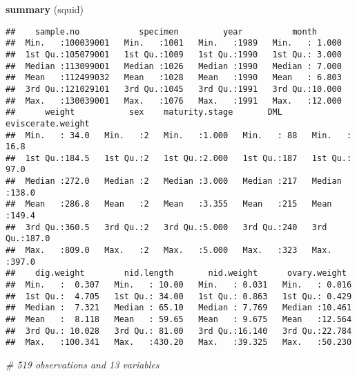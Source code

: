 \documentclass[
]{article}
\newenvironment{Shaded}{\begin{snugshade}}{\end{snugshade}}
\newcommand{\CommentTok}[1]{\textcolor[rgb]{0.56,0.35,0.01}{\textit{#1}}}
\newcommand{\FunctionTok}[1]{\textcolor[rgb]{0.13,0.29,0.53}{\textbf{#1}}}
\newcommand{\NormalTok}[1]{#1}
\newcommand{\OtherTok}[1]{\textcolor[rgb]{0.56,0.35,0.01}{#1}}
\newcommand{\SpecialCharTok}[1]{\textcolor[rgb]{0.81,0.36,0.00}{\textbf{#1}}}
\begin{document}
\begin{Shaded}
\begin{Highlighting}[]
\FunctionTok{summary}\NormalTok{ (squid)}
\end{Highlighting}
\end{Shaded}

\begin{verbatim}
##    sample.no            specimen         year          month       
##  Min.   :100039001   Min.   :1001   Min.   :1989   Min.   : 1.000  
##  1st Qu.:105079001   1st Qu.:1009   1st Qu.:1990   1st Qu.: 3.000  
##  Median :113099001   Median :1026   Median :1990   Median : 7.000  
##  Mean   :112499032   Mean   :1028   Mean   :1990   Mean   : 6.803  
##  3rd Qu.:121029101   3rd Qu.:1045   3rd Qu.:1991   3rd Qu.:10.000  
##  Max.   :130039001   Max.   :1076   Max.   :1991   Max.   :12.000  
##      weight           sex    maturity.stage       DML      eviscerate.weight
##  Min.   : 34.0   Min.   :2   Min.   :1.000   Min.   : 88   Min.   : 16.8    
##  1st Qu.:184.5   1st Qu.:2   1st Qu.:2.000   1st Qu.:187   1st Qu.: 97.0    
##  Median :272.0   Median :2   Median :3.000   Median :217   Median :138.0    
##  Mean   :286.8   Mean   :2   Mean   :3.355   Mean   :215   Mean   :149.4    
##  3rd Qu.:360.5   3rd Qu.:2   3rd Qu.:5.000   3rd Qu.:240   3rd Qu.:187.0    
##  Max.   :809.0   Max.   :2   Max.   :5.000   Max.   :323   Max.   :397.0    
##    dig.weight        nid.length       nid.weight      ovary.weight   
##  Min.   :  0.307   Min.   : 10.00   Min.   : 0.031   Min.   : 0.016  
##  1st Qu.:  4.705   1st Qu.: 34.00   1st Qu.: 0.863   1st Qu.: 0.429  
##  Median :  7.321   Median : 65.10   Median : 7.769   Median :10.461  
##  Mean   :  8.118   Mean   : 59.65   Mean   : 9.675   Mean   :12.564  
##  3rd Qu.: 10.028   3rd Qu.: 81.00   3rd Qu.:16.140   3rd Qu.:22.784  
##  Max.   :100.341   Max.   :430.20   Max.   :39.325   Max.   :50.230
\end{verbatim}

\begin{Shaded}
\begin{Highlighting}[]
\CommentTok{\# 519 observations and 13 variables }
\end{Highlighting}
\end{Shaded}

\begin{Shaded}
\end{Shaded}
\end{document}

